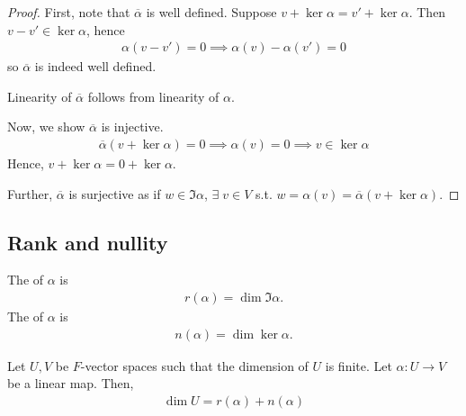 \begin{proof}
    First, note that $\overline\alpha$ is well defined.
    Suppose $v + \ker \alpha = v' + \ker \alpha$.
    Then $v - v' \in \ker \alpha$, hence
    \begin{align*}
        \alpha(v - v') = 0 \implies \alpha(v) - \alpha(v') = 0
    \end{align*}
    so $\overline\alpha$ is indeed well defined.

    Linearity of $\overline \alpha$ follows from linearity of $\alpha$.

    Now, we show $\overline\alpha$ is injective.
    \begin{align*}
        \overline\alpha(v + \ker \alpha) = 0 \implies \alpha(v) = 0 \implies v \in \ker \alpha
    \end{align*}
    Hence, $v + \ker \alpha = 0 + \ker \alpha$.

    Further, $\overline\alpha$ is surjective as if $w \in \Im \alpha$, $\exists \; v \in V$ s.t. $w = \alpha(v) = \overline \alpha(v + \ker \alpha)$.
\end{proof}

\subsection{Rank and nullity}
\begin{definition}
    The  of $\alpha$ is
    \begin{align*}
        r(\alpha) = \dim\Im \alpha.
    \end{align*}
    The  of $\alpha$ is
    \begin{align*}
        n(\alpha) = \dim\ker \alpha.
    \end{align*}
\end{definition}

\begin{theorem}
    Let $U, V$ be $F$-vector spaces such that the dimension of $U$ is finite.
    Let $\alpha \colon U \to V$ be a linear map.
    Then,
    \begin{align*}
        \dim U = r(\alpha) + n(\alpha)
    \end{align*}
\end{theorem}

